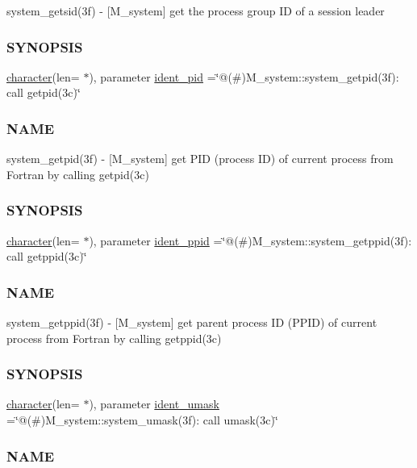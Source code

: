 \begin{DoxyCompactItemize}
\begin{DoxyCompactList}
system\+\_\+getsid(3f) -\/ \mbox{[}M\+\_\+system\mbox{]} get the process group ID of a session leader \subsubsection*{S\+Y\+N\+O\+P\+S\+IS}\end{DoxyCompactList}\item 
\hyperlink{option__stopwatch_83_8txt_abd4b21fbbd175834027b5224bfe97e66}{character}(len= $\ast$), parameter \hyperlink{namespacem__system_a6f5d3dc2ba4ac439e0ba6b428918f956}{ident\+\_\+pid} =\char`\"{}@(\#)M\+\_\+system\+::system\+\_\+getpid(3f)\+: call getpid(3c)\char`\"{}
\begin{DoxyCompactList}\small\item\em \subsubsection*{N\+A\+ME}

system\+\_\+getpid(3f) -\/ \mbox{[}M\+\_\+system\mbox{]} get P\+ID (process ID) of current process from Fortran by calling getpid(3c) \subsubsection*{S\+Y\+N\+O\+P\+S\+IS}\end{DoxyCompactList}\item 
\hyperlink{option__stopwatch_83_8txt_abd4b21fbbd175834027b5224bfe97e66}{character}(len= $\ast$), parameter \hyperlink{namespacem__system_afba2912cdf74d31936daa4cd7a195bcb}{ident\+\_\+ppid} =\char`\"{}@(\#)M\+\_\+system\+::system\+\_\+getppid(3f)\+: call getppid(3c)\char`\"{}
\begin{DoxyCompactList}\small\item\em \subsubsection*{N\+A\+ME}

system\+\_\+getppid(3f) -\/ \mbox{[}M\+\_\+system\mbox{]} get parent process ID (P\+P\+ID) of current process from Fortran by calling getppid(3c) \subsubsection*{S\+Y\+N\+O\+P\+S\+IS}\end{DoxyCompactList}\item 
\hyperlink{option__stopwatch_83_8txt_abd4b21fbbd175834027b5224bfe97e66}{character}(len= $\ast$), parameter \hyperlink{namespacem__system_a75073212be18a8ed970e7a919cf0c75f}{ident\+\_\+umask} =\char`\"{}@(\#)M\+\_\+system\+::system\+\_\+umask(3f)\+: call umask(3c)\char`\"{}
\begin{DoxyCompactList}\small\item\em \subsubsection*{N\+A\+ME}


\end{DoxyCompactList}
\end{DoxyCompactItemize}
